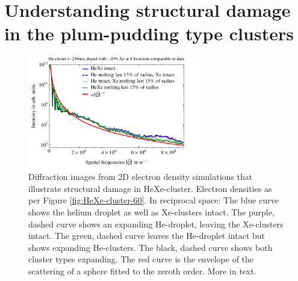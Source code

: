 %
%
%
%
%
%
\section{Understanding structural damage in the plum-pudding type clusters}\label{sec:helium-xenon-data}
\begin{figure}
	\centering
		\includegraphics[width=0.7\textwidth]{images/results/simulations-damage-explain2.pdf}
	\caption[Simulated structural damage scenarios in HeXe-clusters.]{Diffraction images from 2D electron density simulations that illustrate structural damage in HeXe-cluster. Electron densities as per Figure \ref{fig:HeXe-cluster-60}. In reciprocal space: The blue curve shows the helium droplet as well as Xe-clusters intact. The purple, dashed curve shows an expanding He-droplet, leaving the Xe-clusters intact. The green, dashed curve leaves the He-droplet intact but shows expanding He-clusters. The black, dashed curve shows both cluster types expanding. The red curve is the envelope of the scattering of a sphere fitted to the zeroth order. More in text.}
	\label{fig:simulations-damage-explain}
\end{figure}
